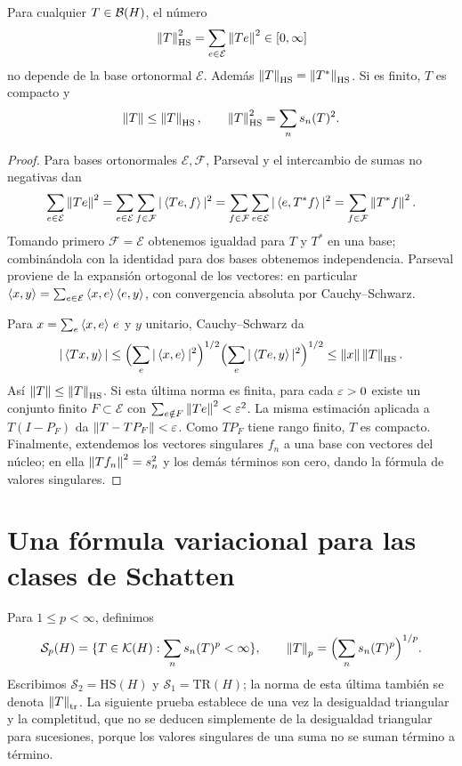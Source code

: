 \begin{proposicion}\label{v3:hilbert-schmidt}
Para cualquier $T\in\mathcal B(H)$, el número
\[\left\lVert T\right\rVert_{\mathrm{HS}}^2=\sum_{e\in\mathcal E}\left\lVert Te\right\rVert^2\in[0,\infty]
\]
no depende de la base ortonormal $\mathcal E$. Además $\left\lVert T\right\rVert_{\mathrm{HS}}=\left\lVert T^*\right\rVert_{\mathrm{HS}}$. Si es finito, $T$ es compacto y
\[\left\lVert T\right\rVert\le\left\lVert T\right\rVert_{\mathrm{HS}},\qquad
\left\lVert T\right\rVert_{\mathrm{HS}}^2=\sum_ns_n(T)^2.
\]
\end{proposicion}
\begin{proof}
Para bases ortonormales $\mathcal E,\mathcal F$, Parseval y el intercambio de sumas no negativas dan
\[\sum_{e\in\mathcal E}\left\lVert Te\right\rVert^2
=\sum_{e\in\mathcal E}\sum_{f\in\mathcal F}|\left\langle Te,f\right\rangle|^2
=\sum_{f\in\mathcal F}\sum_{e\in\mathcal E}|\left\langle e,T^*f\right\rangle|^2
=\sum_{f\in\mathcal F}\left\lVert T^*f\right\rVert^2.
\]
Tomando primero $\mathcal F=\mathcal E$ obtenemos igualdad para $T$ y $T^*$ en una base; combinándola con la identidad para dos bases obtenemos independencia. Parseval proviene de la expansión ortogonal de los vectores: en particular $\left\langle x,y\right\rangle=\sum_{e\in\mathcal E}\left\langle x,e\right\rangle\left\langle e,y\right\rangle$, con convergencia absoluta por Cauchy--Schwarz.

Para $x=\sum_e\left\langle x,e\right\rangle\,e$ y $y$ unitario, Cauchy--Schwarz da
\[|\left\langle Tx,y\right\rangle|\le\Bigl(\sum_e|\left\langle x,e\right\rangle|^2\Bigr)^{1/2}
\Bigl(\sum_e|\left\langle Te,y\right\rangle|^2\Bigr)^{1/2}
\le\left\lVert x\right\rVert\left\lVert T\right\rVert_{\mathrm{HS}}.
\]
Así $\left\lVert T\right\rVert\le\left\lVert T\right\rVert_{\mathrm{HS}}$. Si esta última norma es finita, para cada $\varepsilon>0$ existe un conjunto finito $F\subset\mathcal E$ con $\sum_{e\notin F}\left\lVert Te\right\rVert^2<\varepsilon^2$. La misma estimación aplicada a $T(I-P_F)$ da $\left\lVert T-TP_F\right\rVert<\varepsilon$. Como $TP_F$ tiene rango finito, $T$ es compacto. Finalmente, extendemos los vectores singulares $f_n$ a una base con vectores del núcleo; en ella $\left\lVert Tf_n\right\rVert^2=s_n^2$ y los demás términos son cero, dando la fórmula de valores singulares.
\end{proof}

\section{Una fórmula variacional para las clases de Schatten}
Para $1\le p<\infty$, definimos
\[\mathcal S_p(H)=\{T\in\mathcal K(H):\sum_ns_n(T)^p<\infty\},\qquad
\left\lVert T\right\rVert_p=\Bigl(\sum_ns_n(T)^p\Bigr)^{1/p}.
\]
Escribimos $\mathcal S_2=\mathrm{HS}(H)$ y $\mathcal S_1=\mathrm{TR}(H)$; la norma de esta última también se denota $\left\lVert T\right\rVert_{\mathrm{tr}}$. La siguiente prueba establece de una vez la desigualdad triangular y la completitud, que no se deducen simplemente de la desigualdad triangular para sucesiones, porque los valores singulares de una suma no se suman término a término.

